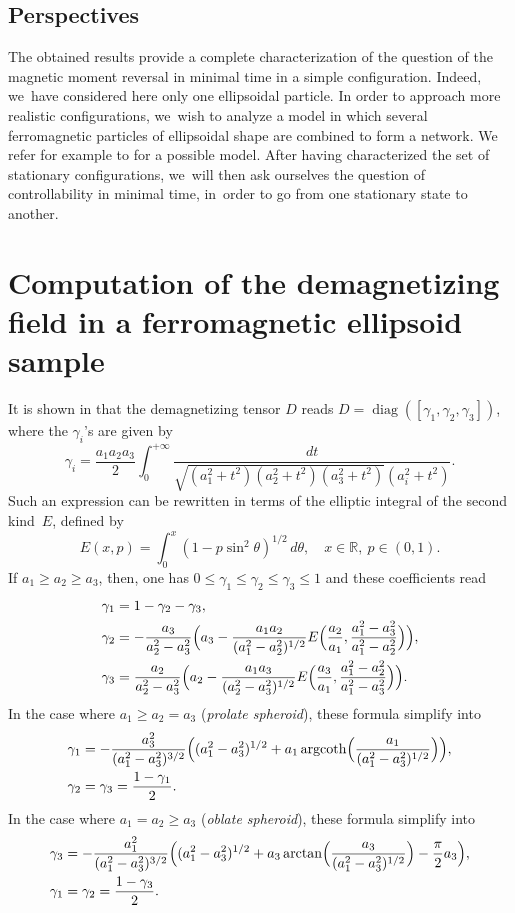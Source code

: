 \documentclass[10pt]{amsart}
\theoremstyle{definition}
\newcommand{\R} {\mathbb{R}}
\begin{document}
\subsection{{Perspectives}}
The obtained results provide a complete characterization of the question of the magnetic moment reversal in minimal time in a simple configuration. Indeed, we~have considered here only one ellipsoidal particle. In order to approach more realistic configurations, we~wish to analyze a model in which several ferromagnetic particles of ellipsoidal shape are combined to form a network. We refer for example to \cite{MR2833256} for a possible model. After having characterized the set of stationary configurations, we~will then ask ourselves the question of controllability in minimal time, in~order to go from one stationary state to another.

\appendix
\section{Computation of the demagnetizing field in a ferromagnetic ellipsoid sample}\label{append:demag_ellips}

It is shown in \cite{osborn1945demagnetizing,di2016newtonian} that the demagnetizing tensor $D$ reads $D=\operatorname{diag}([\gamma_1,\gamma_2,\gamma_3])$, where the $\gamma_i$'s are given by
\[
\gamma_i=\frac{a_1a_2a_3}{2} \int_0^{+\infty}\frac{dt}{\sqrt{(a_1^2+t^2)(a_2^2+t^2)(a_3^2+t^2)}(a_i^2+t^2)}.
\]
Such an expression can be rewritten in terms of the elliptic integral of the second kind~$E$, defined by
\[
E(x,p)=\int_0^x (1-p\sin^2\theta)^{1/2}\, d\theta, \quad x\in \R, \ p\in (0,1).
\]
If $a_1\geq a_2\geq a_3$, then, one has $0\leq \gamma_1\leq \gamma_2\leq \gamma_3\leq 1$ and these coefficients read
\begin{align*}
\gamma_1 &= 1-\gamma_2-\gamma_3,\\
\gamma_2 &= -\frac{a_3}{a_2^2-a_3^2}\Bigl(a_3-\frac{a_1a_2}{(a_1^2-a_2^2)^{1/2}}E\Bigl(\frac{a_2}{a_1},\frac{a_1^2-a_3^2}{a_1^2-a_2^2}\Bigr)\Bigr),\\
\gamma_3 &= \frac{a_2}{a_2^2-a_3^2}\Bigl(a_2-\frac{a_1a_3}{(a_2^2-a_3^2)^{1/2}}E\Bigl(\frac{a_3}{a_1},\frac{a_1^2-a_2^2}{a_1^2-a_3^2}\Bigr)\Bigr).
\end{align*}
In the case where $a_1\geq a_2=a_3$ (\emph{prolate spheroid}), these formula simplify into
\begin{align*}
\gamma_1&= -\frac{a_3^2}{(a_1^2-a_3^2)^{3/2}}\Bigl((a_1^2-a_3^2)^{1/2}+a_1\operatorname{argcoth}\Bigl(\frac{a_1}{(a_1^2-a_3^2)^{1/2}}\Bigr) \Bigr), \\
\gamma_2&=\gamma_3=\frac{1-\gamma_1}{2}.
\end{align*}
In the case where $a_1= a_2\geq a_3$ (\emph{oblate spheroid}), these formula simplify into
\begin{align*}
\gamma_3&= -\frac{a_1^2}{(a_1^2-a_3^2)^{3/2}}\Bigl((a_1^2-a_3^2)^{1/2}+a_3\arctan\Bigl(\frac{a_3}{(a_1^2-a_3^2)^{1/2}}\Bigr) -\frac{\pi}{2}a_3\Bigr), \\
\gamma_1&=\gamma_2=\frac{1-\gamma_3}{2}.
\end{align*}
\end{document}
